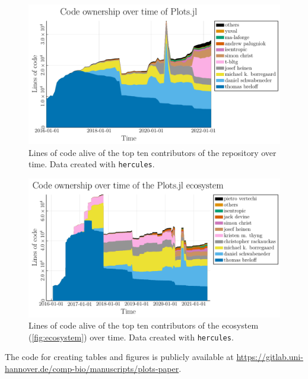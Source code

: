 \begin{figure}[H]
    \centering
    \includegraphics[width=\textwidth]{./fig/Burndown_people_Plots1.13.2}
    \caption{
        Lines of code alive of the top ten contributors of the \Plots repository over time.
        Data created with \texttt{hercules}\cite{SrcdHercules2021}.
        }
    \label{fig:burndown_people}
\end{figure}

\begin{figure}[H]
    \centering
    \includegraphics[width=\textwidth]{./fig/Burndown_people_Plots_Ecosystem1.13.2}
    \caption{
        Lines of code alive of the top ten contributors of the \Plots ecosystem (\cref{fig:ecosystem}) over time.
        Data created with \texttt{hercules}\cite{SrcdHercules2021}.
        }
    \label{fig:burndown_eco}
\end{figure}



The code for creating tables and figures is publicly available at \url{https://gitlab.uni-hannover.de/comp-bio/manuscripts/plots-paper}.

